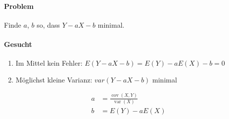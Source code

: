 \documentclass[10pt,a4paper]{scrartcl}
\newif\ifincludeExamples
\newif\ifincludeDerivations
\DeclareMathOperator{\var}{var}
\DeclareMathOperator{\cov}{cov}
\begin{document}
\ifincludeExamples
\paragraph{Beispiel: Wie lange muss ein Verzögerungselement sein?}

\begin{itemize}
\item Konstante Abbrand-Geschwindigkeit, d.h. linearer Zusammenhang zwischen Länge und Brenndauer. $$L = aT + b$$
\end{itemize}

Gesucht ist nun $L = aT + b + Fehler$ mit möglichst kleinem Fehler.
\fi

\paragraph{Problem} Finde $a$, $b$ so, dass $Y-aX-b$ minimal.
\paragraph{Gesucht}
\begin{enumerate}
\item Im Mittel kein Fehler: $E(Y - aX-b) = E(Y) - aE(X) - b = 0$
\item Möglichst kleine Varianz: $var(Y - aX - b)$ minimal
\end{enumerate}

\ifincludeDerivations
Das ist ein Optimierungsproblem. Idee: Ableiten.
\begin{align*}
  \var(Y - aX - b) &= E((Y-aX-b)^2) - E(Y-aX-b)^2 \\ 
                   &= E(Y^2) + a^2E(X^2) + \cancel{b^2} - 2aE(XY) - \cancel{2bE(Y)} + \cancel{2abE(X)} - \\
                   &  \quad \left(E(Y)^2 + a^2E(X)^2 + \cancel{b^2} - 2aE(X)E(Y) - \cancel{2bE(Y)} + \cancel{2abE(X)}\right) \\
                   &=  \var(Y) + a^2\var(X) - 2a\cov(X, Y) = Q\\[0.2cm]
  \frac{\partial Q}{\partial a} &= 2a\var(X) - 2\cov(X, Y) = 0
\end{align*}
\fi
\begin{align*}
                   a &= \frac{\cov(X, Y)}{\var(X)} \\
                   b &= E(Y) - aE(X)
\end{align*}
\end{document}
